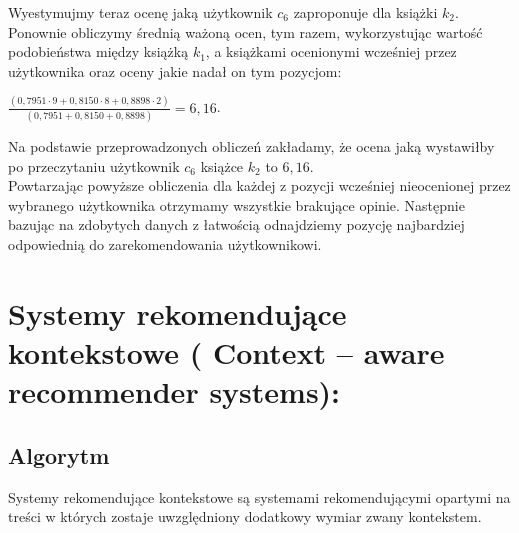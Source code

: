 \documentclass[12pt,a4paper]{report}
\begin{document}
Wyestymujmy teraz ocenę jaką użytkownik $c_6$ zaproponuje dla książki $k_2$. Ponownie obliczymy średnią ważoną ocen, tym razem, wykorzystując wartość podobieństwa między książką $k_1$, a książkami ocenionymi wcześniej przez użytkownika oraz oceny jakie nadał on tym pozycjom:
\begin{center}
$\frac{(0,7951 \cdot 9 + 0,8150 \cdot 8 + 0,8898 \cdot 2)}{(0,7951 + 0,8150 + 0,8898)} = 6,16 $.
\end{center}
Na podstawie przeprowadzonych obliczeń zakładamy, że ocena jaką wystawiłby po przeczytaniu użytkownik $c_6$ książce $k_2$ to $6,16$.
\\Powtarzając powyższe obliczenia dla każdej z pozycji wcześniej nieocenionej przez wybranego użytkownika otrzymamy wszystkie brakujące opinie. Następnie bazując na zdobytych danych z łatwością odnajdziemy pozycję najbardziej odpowiednią do zarekomendowania użytkownikowi.






\section{Systemy rekomendujące kontekstowe ( Context – aware recommender systems):}

\subsection{Algorytm}
Systemy rekomendujące kontekstowe są systemami rekomendującymi opartymi na treści w których zostaje uwzględniony dodatkowy wymiar zwany kontekstem.
\end{document}
